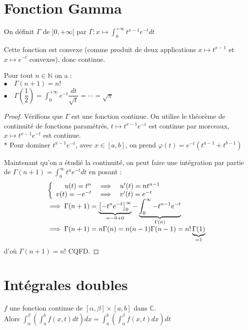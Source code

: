 \documentclass[11pt,a4paper,fleqn,pdftex]{report}
\begin{document}
\section{Fonction Gamma}
\begin{dfn}
On définit $\Gamma$ de $]0,+\infty[$ par
$\Gamma : x \mapsto  \int_0^{+\infty}t^{x-1}e^{-t}dt$
\end{dfn}
Cette fonction est convexe (comme produit de deux applications $x \mapsto t^{x-1}$ et $x \mapsto e^{-t}$ convexes), donc continue.
\begin{itheorem}
Pour tout $n\in\mathbb{N}$ on a :\\
 $\bullet \quad \Gamma{}(n+1)=n!$\\
 $\bullet \quad \Gamma \left( \dfrac{1}{2} \right) =\int_{0}^{+\infty}e^{-t}\dfrac{dt}{\sqrt{t}}=\cdots=\sqrt{\pi}$
\end{itheorem}
\begin{proof}
Vérifions que $\Gamma$ est une fonction continue. On utilise le théorème de continuité de fonctions paramétrés, $t \mapsto t^{x-1}e^{-t} $ est continue par morceaux, $x \mapsto t^{x-1}e^{-t} $ est continue. \\*
Pour dominer $t^{x-1}e^{-t}$, avec $x \in [a,b]$, on prend $\varphi (t)= e^{-t}(t^{a-1}+t^{b-1}) $
\par
Maintenant qu'on a étudié la continuité, on peut faire une intégration par partie de $\Gamma (n+1) = \int_0 ^\infty t^{n} e^{-t} dt$ en posant : 
\[
\begin{array}{l}
  \left\lbrace
		\begin{array}{r c l}
		u(t) = t^n &\implies & u'(t) = nt^{n-1}\\
		v(t) = -e^{-t} &\implies & v'(t) = e^{-t}
		\end{array}
  \right. \\
\implies \Gamma(n+1)=\underbrace{\left[ -t^n e^{-t} \right]_0^\infty}_{\mathclap{= -0 + 0}} - \underbrace{\int_0^\infty -t^{n-1}e^{-t}}_{\Gamma(n)}\\
\implies \Gamma(n+1)=n\Gamma(n)=n(n-1)\Gamma(n-1)=n!\underbrace{\Gamma(1)}_{=1}
\end{array}
\]
d'où $\Gamma(n+1)=n!$	CQFD.
\end{proof}
\section{Intégrales doubles}

\begin{dfn}
$f$ une fonction continue de $[\alpha{},\beta{}]\times [a,b]$ dans $\mathbb{C}$. \\
Alors $\displaystyle\int_{\alpha}^{\beta}\left(\displaystyle\int_{a}^{b}f(x,t)dt\right)dx=\displaystyle\int_{a}^{b}\left(\displaystyle\int_{\alpha}^{\beta}f(x,t)dx\right)dt$
\end{dfn}
\end{document}
